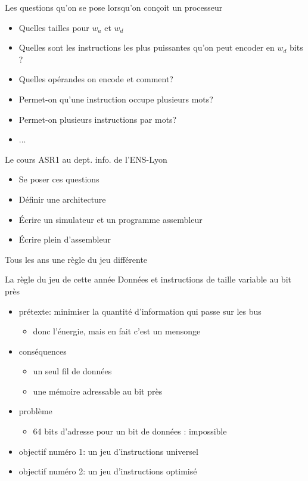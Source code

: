 \documentclass[slidetop,11pt,table]{beamer}
\begin{document}
\begin{frame}{Les questions qu'on se pose lorsqu'on conçoit un processeur}
  \begin{figure}[h]
    \centering
  \end{figure}
  \begin{itemize}
  \item Quelles tailles pour $w_a$ et $w_d$
  \item Quelles sont les instructions les plus puissantes qu'on peut encoder en $w_d$ bits ?
  \item Quelles opérandes on encode et comment?
    
  \item Permet-on qu'une instruction occupe plusieurs mots?
  \item Permet-on plusieurs instructions par mots?
  \item ...
    
  \end{itemize}
\end{frame}

\begin{frame}{Le cours ASR1 au dept. info. de l'ENS-Lyon}
  \begin{itemize}
  \item Se poser ces questions
  \item Définir une architecture
  \item Écrire un simulateur et un programme assembleur
  \item Écrire plein d'assembleur
  \end{itemize}
  Tous les ans une règle du jeu différente
\end{frame}

\begin{frame}{La règle du jeu de cette année}
  Données et instructions de taille variable au bit près
  \begin{itemize}
  \item prétexte: minimiser la quantité d'information qui passe sur les bus
    \begin{itemize}
    \item donc l'énergie, mais en fait c'est un mensonge
    \end{itemize}
    \pause
  \item conséquences
    \begin{itemize}
    \item un seul fil de données
    \item une mémoire adressable au bit près
    \end{itemize}
  \item problème
    \begin{itemize}
    \item 64 bits d'adresse pour un bit de données : impossible 
  \end{itemize}
  \item objectif numéro 1: un jeu d'instructions universel
  \item objectif numéro 2: un jeu d'instructions optimisé
  \end{itemize}
\end{frame}
\end{document}
